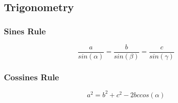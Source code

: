 \subsection{Trigonometry}

\subsubsection{Sines Rule}
$$ \dfrac{a}{sin(\alpha)} = \dfrac{b}{sin(\beta)} = \dfrac{c}{sin(\gamma)} $$

\subsubsection{Cossines Rule}
$$ a^2 = b^2 + c^2 - 2bccos(\alpha) $$
